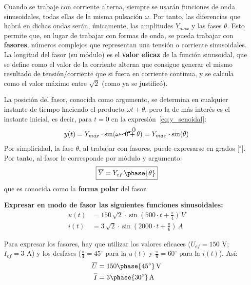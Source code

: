 Cuando se trabaje con corriente alterna, siempre se usarán funciones
de onda sinusoidales, todas ellas de la misma pulsación $\omega$. Por
tanto, las diferencias que habrá en dichas ondas serán, únicamente,
las amplitudes $Y_{max}$ y las fases $\theta$. Esto permite que, en
lugar de trabajar con formas de onda, se pueda trabajar con
\textbf{fasores}, números complejos que representan una tensión o
corriente sinusoidales.  La longitud del fasor (su módulo) es el
\textbf{valor eficaz} de la función sinusoidal, que se define como el
valor de la corriente alterna que consigue generar el mismo resultado
de tensión/corriente que si fuera en corriente continua, y se calcula
como el valor máximo entre $\sqrt{2}$ (como ya se justificó).

La posición del fasor, conocida como argumento, se determina en
cualquier instante de tiempo haciendo el producto $\omega t+\theta$,
pero la de más interés es el instante inicial, es decir, para $t=0$ en
la expresión~\eqref{eq:y_senoidal}:
\begin{equation*}
  y(t)=Y_{max}\cdot\sin(\cancelto{0}{\omega \cdot 0}+\theta)=Y_{max}\cdot\sin(\theta)
\end{equation*}
Por simplicidad, la fase $\theta$, al trabajar con fasores, puede
expresarse en grados [$^\circ$]. Por tanto, al fasor le corresponde
por módulo y argumento:
\begin{equation}
  \boxed{\overline{Y}=Y_{ef}\,\phase{\theta}}
\end{equation}
que es conocida como la \textbf{forma polar} del fasor.
	
\begin{example}
  \textbf{Expresar en modo de fasor las siguientes funciones
    sinusoidales:}
  \begin{align*}
    u(t)&=150\,\sqrt{2}\cdot \sin(500\cdot t+\frac{\pi}{4})\, V\\
    i(t) &= 3\,\sqrt{2}\cdot \sin(2000\cdot t+\frac{\pi}{6})\,A
  \end{align*}
		
  Para expresar los fasores, hay que utilizar los valores eficaces
  ($U_{ef}=150$ V; $I_{ef}=3$ A) y los desfases
  ($\frac{\pi}{4}=45^\circ$ para la $u(t)$ y $\frac{\pi}{6}=60^\circ$
  para la $i(t)$). Así:
  \begin{align*}
    \overline{U}&=150\phase{45^\circ} \,\si{\volt}\\
    \overline{I}&=3\phase{30^\circ}\,\si{\ampere}
  \end{align*}
\end{example}
	
